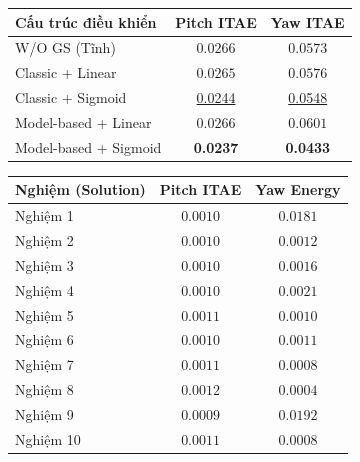\documentclass[conference, a4paper]{IEEEtran}
\begin{document}
\begin{center}
\small
{}
\label{tab:rq2-gain-scheduling-metrics}
\begin{tabular}{lcc}
\toprule
Cấu trúc điều khiển & Pitch ITAE & Yaw ITAE \\
\midrule
W/O GS (Tĩnh) & $0.0266$ & $0.0573$ \\
Classic + Linear & $0.0265$ & $0.0576$ \\
Classic + Sigmoid & \underline{0.0244} & \underline{0.0548} \\
Model-based + Linear & $0.0266$ & $0.0601$ \\
Model-based + Sigmoid & \textbf{0.0237} & \textbf{0.0433} \\
\bottomrule
\end{tabular}

\vspace{0.35\baselineskip}

\label{tab:pareto-front-metrics}
\begin{tabular}{lcc}
\toprule
Nghiệm (Solution) & Pitch ITAE & Yaw Energy \\
\midrule
Nghiệm 1 & $0.0010$ & $0.0181$ \\
Nghiệm 2 & $0.0010$ & $0.0012$ \\
Nghiệm 3 & $0.0010$ & $0.0016$ \\
Nghiệm 4 & $0.0010$ & $0.0021$ \\
Nghiệm 5 & $0.0011$ & $0.0010$ \\
Nghiệm 6 & $0.0010$ & $0.0011$ \\
Nghiệm 7 & $0.0011$ & $0.0008$ \\
Nghiệm 8 & $0.0012$ & $0.0004$ \\
Nghiệm 9 & $0.0009$ & $0.0192$ \\
Nghiệm 10 & $0.0011$ & $0.0008$ \\
\bottomrule
\end{tabular}
\end{center}
\end{document}
